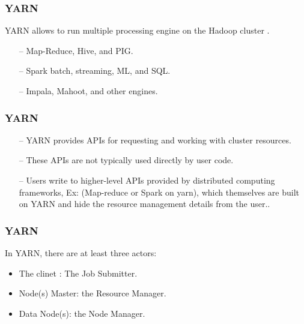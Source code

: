 \begin{frame}[c]{ }
	\frametitle{YARN }
	YARN allows to run multiple processing engine on the Hadoop cluster .
	{\footnotesize
	\begin{itemize}  [<+->]
		\item [--] Map-Reduce, Hive, and PIG.
		\item [--] Spark batch, streaming, ML, and SQL.
		\item [--] Impala, Mahoot, and other engines.
	\end{itemize}
	}
\end{frame}
\begin{frame}[c]{ }
	\frametitle{YARN }

	{\footnotesize
		\begin{itemize}  [<+->]
			\item [--] YARN provides APIs for requesting and working with cluster resources.
			\item [--] These APIs are  not  typically  used  directly  by  user  code.
			\item [--] Users  write  to  higher-level APIs provided by distributed computing frameworks, Ex: (Map-reduce or Spark on yarn), which themselves are built on YARN and hide the resource management details from the user..
		\end{itemize}
	}
\end{frame}
\begin{frame}[c]{ }
	\frametitle{YARN }
	In YARN, there are at least three actors:	
	{\footnotesize
		\begin{itemize}  [<+->]
			\item The clinet : The Job Submitter.
			\item Node(s) Master: the Resource Manager.
			\item Data Node(s): the Node Manager.
		\end{itemize}
}

\end{frame}
